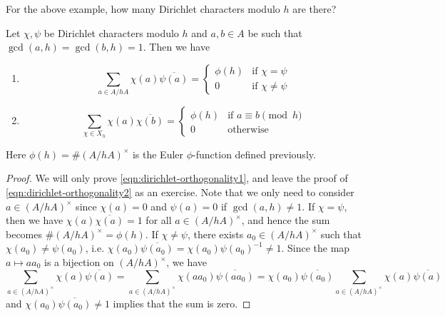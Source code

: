\begin{exercise}
    For the above example, how many Dirichlet characters modulo $h$ are there?
\end{exercise}

\begin{theorem}[Orthogonality]
    \label{thm:dirichlet-orthogonality}
    Let $\chi, \psi$ be Dirichlet characters modulo $h$ and $a, b \in A$ be such that $\gcd(a, h) = \gcd(b, h) = 1$.
    Then we have
    \begin{enumerate}
        \item
        \begin{equation}
            \sum_{a \in A / hA} \chi(a) \overline{\psi(a)} = \begin{cases}
                \phi(h) & \text{if } \chi = \psi \\
                0 & \text{if } \chi \ne \psi
            \end{cases}
        \label{eqn:dirichlet-orthogonality1}
        \end{equation}
        \item
        \begin{equation}
            \sum_{\chi \in X_h} \chi(a) \overline{\chi(b)} = \begin{cases}
                \phi(h) & \text{if } a \equiv b \pmod{h} \\
                0 & \text{otherwise}
            \end{cases}
        \label{eqn:dirichlet-orthogonality2}
        \end{equation}
    \end{enumerate}
    Here $\phi(h) = \#(A / hA)^\times$ is the Euler $\phi$-function defined previously.
\end{theorem}
\begin{proof}
    We will only prove \eqref{eqn:dirichlet-orthogonality1}, and leave the proof of \eqref{eqn:dirichlet-orthogonality2} as an exercise.
    Note that we only need to consider $a \in (A / hA)^\times$ since $\chi(a) = 0$ and $\psi(a) = 0$ if $\gcd(a, h) \ne 1$.
    If $\chi = \psi$, then we have $\chi(a)\overline{\chi(a)} = 1$ for all $a \in (A / hA)^\times$, and hence the sum becomes $\#(A / hA)^\times = \phi(h)$.
    If $\chi \ne \psi$, there exists $a_0 \in (A / hA)^\times$ such that $\chi(a_0) \ne \psi(a_0)$, i.e. $\chi(a_0) \overline{\psi(a_0)} = \chi(a_0) \psi(a_0)^{-1} \ne 1$.
    Since the map $a \mapsto a a_0$ is a bijection on $(A / hA)^\times$, we have
    \[
    \sum_{a \in (A / hA)^\times} \chi(a) \overline{\psi(a)} = \sum_{a \in (A / hA)^\times} \chi(a a_0) \overline{\psi(a a_0)} = \chi(a_0)\overline{\psi(a_0)}\sum_{a \in (A / hA)^\times} \chi(a) \overline{\psi(a)}
    \]
    and $\chi(a_0) \overline{\psi(a_0)} \ne 1$ implies that the sum is zero.
\end{proof}

